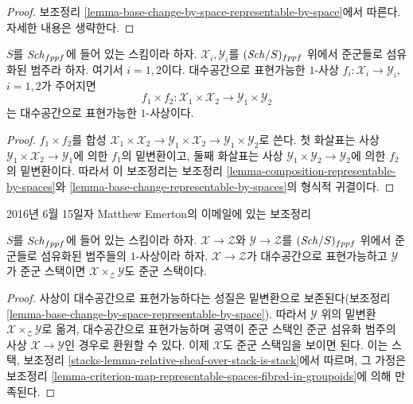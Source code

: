 \begin{proof}
보조정리 \ref{lemma-base-change-by-space-representable-by-space}에서
따른다. 자세한 내용은 생략한다.
\end{proof}

\begin{lemma}
\label{lemma-product-representable-by-spaces}
$S$를 $\mathit{Sch}_{fppf}$에 들어 있는 스킴이라 하자.
$\mathcal{X}_i, \mathcal{Y}_i$를 $(\mathit{Sch}/S)_{fppf}$ 위에서 준군들로
섬유화된 범주라 하자. 여기서 $i = 1, 2$이다. 대수공간으로 표현가능한
$1$-사상 $f_i : \mathcal{X}_i \to \mathcal{Y}_i$, $i = 1, 2$가
주어지면
$$
f_1 \times f_2 :
\mathcal{X}_1 \times \mathcal{X}_2
\longrightarrow
\mathcal{Y}_1 \times \mathcal{Y}_2
$$
는 대수공간으로 표현가능한 $1$-사상이다.
\end{lemma}

\begin{proof}
$f_1 \times f_2$를 합성
$\mathcal{X}_1 \times \mathcal{X}_2 \to
\mathcal{Y}_1 \times \mathcal{X}_2 \to
\mathcal{Y}_1 \times \mathcal{Y}_2$로 쓴다. 첫 화살표는 사상
$\mathcal{Y}_1 \times \mathcal{X}_2 \to \mathcal{Y}_1$에 의한
$f_1$의 밑변환이고, 둘째 화살표는 사상
$\mathcal{Y}_1 \times \mathcal{Y}_2 \to \mathcal{Y}_2$에 의한
$f_2$의 밑변환이다. 따라서 이 보조정리는 보조정리
\ref{lemma-composition-representable-by-spaces}와
\ref{lemma-base-change-representable-by-spaces}의 형식적 귀결이다.
\end{proof}

\begin{lemma}
\label{lemma-get-a-stack}
\begin{reference}
2016년 6월 15일자 Matthew Emerton의 이메일에 있는 보조정리
\end{reference}
$S$를 $\mathit{Sch}_{fppf}$에 들어 있는 스킴이라 하자.
$\mathcal{X} \to \mathcal{Z}$와 $\mathcal{Y} \to \mathcal{Z}$를
$(\mathit{Sch}/S)_{fppf}$ 위에서 준군들로 섬유화된 범주들의 $1$-사상이라 하자.
$\mathcal{X} \to \mathcal{Z}$가 대수공간으로 표현가능하고
$\mathcal{Y}$가 준군 스택이면
$\mathcal{X} \times_\mathcal{Z} \mathcal{Y}$도 준군 스택이다.
\end{lemma}

\begin{proof}
사상이 대수공간으로 표현가능하다는 성질은 밑변환으로 보존된다(보조정리
\ref{lemma-base-change-by-space-representable-by-space}). 따라서
$\mathcal{Y}$ 위의 밑변환 $\mathcal{X} \times_\mathcal{Z} \mathcal{Y}$로
옮겨, 대수공간으로 표현가능하며 공역이 준군 스택인 준군 섬유화 범주의
사상 $\mathcal{X} \to \mathcal{Y}$인 경우로 환원할 수 있다. 이제
$\mathcal{X}$도 준군 스택임을 보이면 된다. 이는 스택, 보조정리
\ref{stacks-lemma-relative-sheaf-over-stack-is-stack}에서 따르며, 그 가정은
보조정리
\ref{lemma-criterion-map-representable-spaces-fibred-in-groupoids}에 의해
만족된다.
\end{proof}







